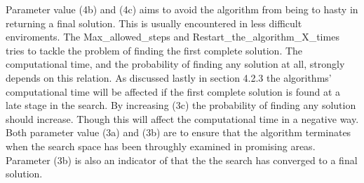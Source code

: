 Parameter value (4b) and (4c) aims to avoid the algorithm from being to hasty in returning a final solution. This is usually encountered in less difficult enviroments. The Max\_allowed\_steps and Restart\_the\_algorithm\_X\_times tries to tackle the problem of finding the first complete solution. The computational time, and the probability of finding any solution at all, strongly depends on this relation. As discussed lastly in section 4.2.3 the algorithms' computational time will be affected if the first complete solution is found at a late stage in the search. By increasing (3c) the probability of finding any solution should increase. Though this will affect the computational time in a negative way. Both parameter value (3a) and (3b) are to ensure that the algorithm terminates when the search space has been throughly examined in promising areas.
Parameter (3b) is also an indicator of that the the search has converged to a final solution.\\
